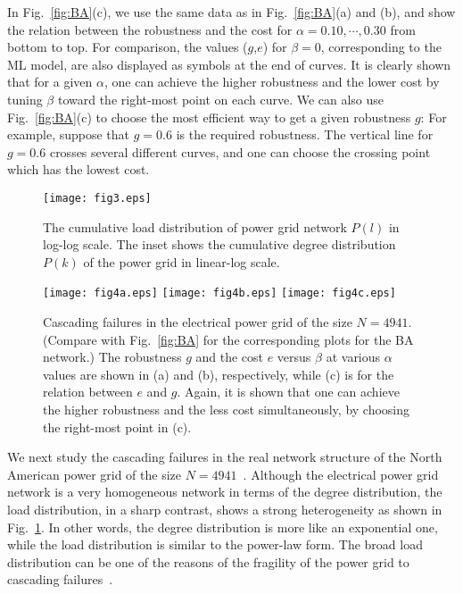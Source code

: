 \documentclass[doublecol]{epl2}
\begin{document}
In Fig.~\ref{fig:BA}(c), we use the same data as in
Fig.~\ref{fig:BA}(a) and (b), and show the relation between the
robustness and the cost for $\alpha=0.10, \cdots, 0.30$ from bottom
to top. For comparison, the values ($g$,$e$) for $\beta = 0$,
corresponding to the ML model, are also displayed as symbols at the
end of curves. It is clearly shown that for a given $\alpha$, one
can achieve the higher robustness and the lower cost by tuning
$\beta$ toward the right-most point on each curve. We can also use
Fig.~\ref{fig:BA}(c) to choose  the most efficient way to get a
given robustness $g$: For example, suppose that $g = 0.6$ is the
required robustness. The vertical line for $g=0.6$ crosses several
different curves, and one can choose the crossing point which has
the lowest cost.

\begin{figure}
\begin{center}
{\texttt{[image: fig3.eps]}} \caption{The
cumulative load distribution of power grid network $P(l)$ in log-log
scale. The inset shows the cumulative degree distribution $P(k)$ of
the power grid in linear-log scale. } \label{fig:powerdist}
\end{center}
\end{figure}
\begin{figure}
\begin{center}
{\texttt{[image: fig4a.eps]}}
{\texttt{[image: fig4b.eps]}}
{\texttt{[image: fig4c.eps]}} \caption{
Cascading failures in the electrical power grid of the size
$N=4941$. (Compare with Fig.~\ref{fig:BA} for the corresponding
plots for the BA network.) The robustness $g$  and the cost $e$
versus $\beta$ at various $\alpha$ values are shown in (a) and (b),
respectively, while (c) is for the relation between $e$ and $g$.
Again, it is shown that one can achieve the higher robustness and
the less cost simultaneously, by choosing the right-most point in
(c). } \label{fig:power}
\end{center}
\end{figure}

We next study the cascading failures in the real network structure
of the North American power grid of the size
$N=4941$~\cite{Powerdata}. Although the electrical power grid
network is a very homogeneous network in terms of the degree
distribution, the load distribution, in a sharp contrast, shows a
strong heterogeneity as shown in Fig.~\ref{fig:powerdist}. In other
words, the degree distribution is more like an exponential one,
while the load distribution is similar to the power-law form. The
broad load distribution  can be one of the reasons of the fragility
of the power grid to cascading failures~\cite{CasModel}.
\end{document}
